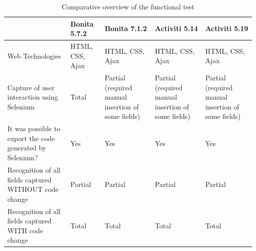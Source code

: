 \documentclass[runningheads,a4paper]{llncs}
\begin{document}
\begin{table}
\centering
\begin{center}
\begin{tabular}{p{3cm}|p{2cm}|p{2.5cm}|p{2.5cm}|p{2.5cm}}
\hline
 & Bonita 5.7.2 & Bonita 7.1.2 & Activiti 5.14 & Activiti 5.19 \\\hline
Web Technologies & HTML, CSS, Ajax & HTML, CSS, Ajax & HTML, CSS, Ajax & HTML, CSS, Ajax \\\hline
Capture of user interaction using Selenium & Total & Partial (required manual insertion of some fields) & Partial (required manual insertion of some fields) & Partial (required manual insertion of some fields) \\\hline
It was possible to export the code generated by Selenium? & Yes & Yes & Yes & Yes\\\hline
Recognition of all fields captured WITHOUT code change & Partial & Partial & Partial & Partial \\\hline
Recognition of all fields captured WITH code change & Total & Total & Total & Total \\\hline
\end{tabular}
\caption{Comparative overview of the functional test}
\label{tab:testeFuncional}
\end{center}
\end{table}



\end{document}
